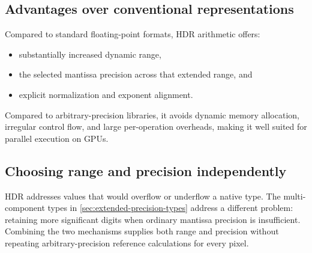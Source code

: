 \subsection{Advantages over conventional representations}

Compared to standard floating-point formats, HDR arithmetic offers:
\begin{itemize}
\item substantially increased dynamic range,
\item the selected mantissa precision across that extended range, and
\item explicit normalization and exponent alignment.
\end{itemize}

Compared to arbitrary-precision libraries, it avoids dynamic memory allocation,
irregular control flow, and large per-operation overheads, making it well suited
for parallel execution on GPUs.

\subsection{Choosing range and precision independently}

HDR addresses values that would overflow or underflow a native type. The
multi-component types in \cref{sec:extended-precision-types} address a different
problem: retaining more significant digits when ordinary mantissa precision is
insufficient. Combining the two mechanisms supplies both range and precision
without repeating arbitrary-precision reference calculations for every pixel.

